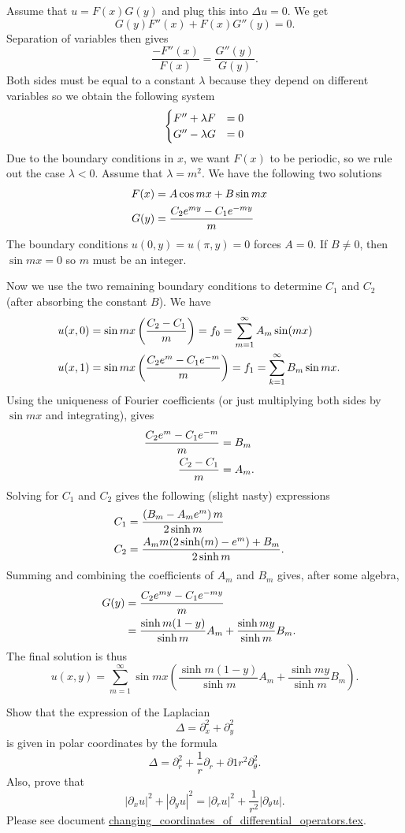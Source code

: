 \documentclass[12pt,letterpaper,boxed]{jhwhw}
\newcommand{\abs}[1]{\left| #1 \right|}
\begin{document}
\solution
Assume that $u = F(x) G(y)$ and plug this into $\Delta u = 0$. We get
\[
	G(y) F''(x) + F(x) G''(y) = 0.
\]
Separation of variables then gives
\[
	\frac{-F''(x)}{F(x)} = \frac{G''(y)}{G(y)}.
\]
Both sides must be equal to a constant $\lambda$ because they depend on different variables so we obtain the following system
\[
	\begin{cases}
		F'' + \lambda F &= 0 \cr
		G'' - \lambda G &= 0
	\end{cases}
\]
Due to the boundary conditions in $x$, we want $F(x)$ to be periodic, so we rule out the case $\lambda < 0$. Assume that $\lambda = m^2$. We have the following two solutions
\[
	\begin{aligned}
		F(x) &= A \cos mx + B \sin mx \cr
		G(y) &= \frac{C_2 e^{my} - C_1 e^{-my}}{m}
	\end{aligned}
\]
The boundary conditions $u(0, y) = u(\pi, y) = 0$ forces $A = 0$. If $B \neq 0$, then $\sin mx = 0$ so $m$ must be an integer.

Now we use the two remaining boundary conditions to determine $C_1$ and $C_2$ (after absorbing the constant $B$). We have
\[
	\begin{aligned}
		u(x, 0) &=  \sin mx \left( \frac{C_2  - C_1 }{m} \right) = f_0 = \sum_{m = 1}^\infty A_m \sin(m x) \cr
		u(x, 1) &=  \sin mx \left( \frac{C_2 e^{m} - C_1 e^{-m}}{m} \right) = f_1 = \sum_{k = 1}^\infty B_m \sin mx.
	\end{aligned}
\]
Using the uniqueness of Fourier coefficients (or just multiplying both sides by $\sin mx$ and integrating), gives
\[
	\begin{aligned}
		\frac{C_2 e^m - C_1 e^{-m}}{m} &= B_m \cr
		\frac{C_2 - C_1}{m} &= A_m.
	\end{aligned}
\]
Solving for $C_1$ and $C_2$ gives the following (slight nasty) expressions
\[
	\begin{aligned}
		C_1 &= \frac{\left( B_m - A_m e^m \right) m}{2 \sinh m} \cr
		C_2 &= \frac{A_m m (2 \sinh(m) - e^m) + B_m}{2 \sinh m}.
	\end{aligned}
\]
Summing and combining the coefficients of $A_m$ and $B_m$ gives, after some algebra,
\[
	\begin{aligned}
		G(y) &= \frac{C_2 e^{my} - C_1 e^{-my}}{m} \cr
		     &= \frac{\sinh m(1 - y)}{\sinh m} A_m + \frac{\sinh{my}}{\sinh{m}} B_m.
	\end{aligned}
\]
The final solution is thus
\[
	u(x, y) = \sum_{m = 1}^\infty \sin mx \left( \frac{\sinh m(1 - y)}{\sinh m} A_m + \frac{\sinh{my}}{\sinh{m}} B_m \right).
\]

Show that the expression of the Laplacian
\[
	\Delta = \partial_x^2 + \partial_y^2
\]
is given in polar coordinates by the formula
\[
	\Delta = \partial_r^2 + \frac{1}{r} \partial_r + \partial{1}{r^2} \partial_\theta^2.
\]
Also, prove that
\[
	\abs{\partial_x u }^2 + \abs{\partial_y u}^2 = \abs{\partial_r u}^2 + \frac{1}{r^2} \abs{\partial_\theta u}.
\]
\solution
Please see document \url{changing_coordinates_of_differential_operators.tex}.
\end{document}
